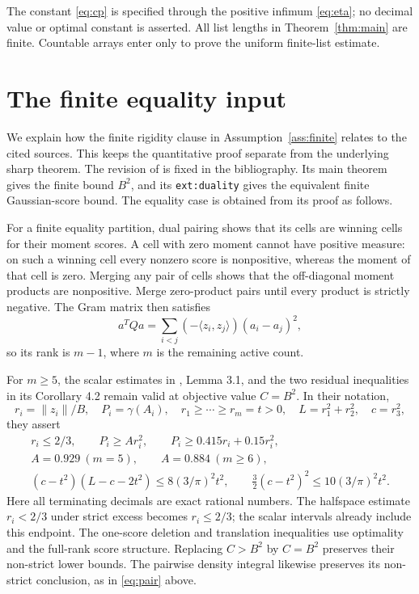 \documentclass[11pt,reqno]{amsart}
\numberwithin{equation}{section}
\theoremstyle{definition}
\theoremstyle{remark}
\begin{document}
The constant \eqref{eq:cp} is specified through the positive infimum
\eqref{eq:eta}; no decimal value or optimal constant is asserted.
All list lengths in Theorem~\ref{thm:main} are finite. Countable
arrays enter only to prove the uniform finite-list estimate.

\appendix
\section{The finite equality input}\label{app:input}
We explain how the finite rigidity clause in
Assumption~\ref{ass:finite} relates to the cited sources. This keeps
the quantitative proof separate from the underlying sharp theorem.
The revision of \cite{OpenAI} is fixed in the bibliography.
Its main theorem gives the finite bound $B^2$, and its
\texttt{ext:duality} gives the equivalent finite Gaussian-score
bound. The equality case is obtained from its proof as follows.

For a finite equality partition, dual pairing shows that its cells
are winning cells for their moment scores. A cell with zero moment
cannot have positive measure: on such a winning cell every nonzero
score is nonpositive, whereas the moment of that cell is zero.
Merging any pair of cells shows that the off-diagonal moment products
are nonpositive. Merge zero-product pairs until every product is
strictly negative. The Gram matrix then satisfies
\[
 a^TQa=\sum_{i<j}(-\langle z_i,z_j\rangle)(a_i-a_j)^2,
\]
so its rank is $m-1$, where $m$ is the remaining active count.

For $m\ge5$, the scalar estimates in \cite{OpenAI},
Lemma 3.1, and the two residual inequalities in its Corollary 4.2
remain valid at objective value $C=B^2$. In their notation,
\[
 r_i=\|z_i\|/B,\quad P_i=\gamma(A_i),\quad
 r_1\ge\cdots\ge r_m=t>0,\quad L=r_1^2+r_2^2,\quad c=r_3^2,
\]
they assert
\begin{gather*}
 r_i\le2/3,\qquad P_i\ge A r_i^2,\qquad
 P_i\ge0.415r_i+0.15r_i^2,\\
 A=0.929\ (m=5),\qquad A=0.884\ (m\ge6),\\
 (c-t^2)(L-c-2t^2)\le8(3/\pi)^2t^2,\qquad
 \tfrac32(c-t^2)^2\le10(3/\pi)^2t^2.
\end{gather*}
Here all terminating decimals are exact rational numbers. The
halfspace estimate $r_i<2/3$ under strict excess becomes $r_i\le2/3$;
the scalar intervals already include this endpoint. The one-score
deletion and translation inequalities use optimality and the
full-rank score structure. Replacing $C>B^2$ by $C=B^2$ preserves
their non-strict lower bounds. The pairwise density integral likewise
preserves its non-strict conclusion, as in \eqref{eq:pair} above.
\end{document}
